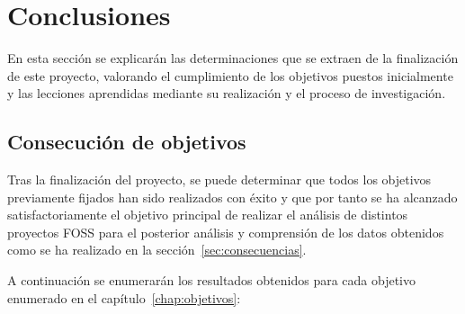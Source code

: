 \documentclass[a4paper, spanish, 12pt]{book}
\begin{document}

\cleardoublepage
\chapter{Conclusiones}
\label{chap:conclusiones}

En esta secci\'on se explicar\'an las determinaciones que se extraen de
la finalizaci\'on de este proyecto, valorando el cumplimiento de los objetivos
puestos inicialmente y las lecciones aprendidas mediante su realizaci\'on y el
proceso de investigaci\'on.

\section{Consecuci\'on de objetivos}
\label{sec:consecucion-objetivos}

Tras la finalizaci\'on del proyecto, se puede determinar que todos los objetivos
previamente fijados han sido realizados con \'exito y que por tanto se ha alcanzado
satisfactoriamente el objetivo principal de realizar el an\'alisis de distintos
proyectos FOSS para el posterior an\'alisis y comprensi\'on de los datos obtenidos como
se ha realizado en la secci\'on~\ref{sec:consecuencias}.

A continuaci\'on se enumerar\'an los resultados obtenidos para cada objetivo enumerado en
el cap\'itulo~\ref{chap:objetivos}:
\end{document}
